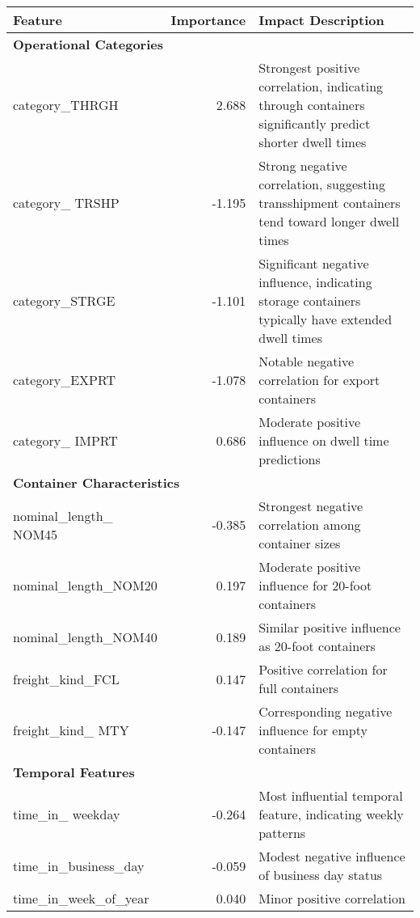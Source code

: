 		\begin{table}[htbp]
			\centering
			\begin{tabular}{|l|r|p{7cm}|}
				\hline
				\textbf{Feature} & \textbf{Importance} & \textbf{Impact Description}
				\\
				\hline
				\multicolumn{3}{|l|}{\textbf{Operational Categories}} \\
				\hline
				category\_THRGH & 2.688 & Strongest positive correlation, indicating
				through
				containers significantly predict shorter dwell times \\
				\hline
				category\_
				TRSHP & -1.195 & Strong negative correlation, suggesting transshipment
				containers tend toward longer dwell times \\
				\hline
				category\_STRGE & -1.101 & Significant negative influence, indicating
				storage
				containers typically have extended dwell times \\
				\hline
				category\_EXPRT & -1.078 & Notable negative correlation for export
				containers
				\\
				\hline
				category\_
				IMPRT & 0.686 & Moderate positive influence on dwell time predictions
				\\
				\hline
				\multicolumn{3}{|l|}{\textbf{Container Characteristics}} \\
				\hline
				nominal\_length\_
				NOM45 & -0.385 & Strongest negative correlation among container sizes
				\\
				\hline
				nominal\_length\_NOM20 & 0.197 & Moderate positive influence for 20-foot
				containers
				\\
				\hline
				nominal\_length\_NOM40 & 0.189 & Similar positive influence as 20-foot containers
				\\
				\hline
				freight\_kind\_FCL & 0.147 & Positive correlation for full containers
				\\
				\hline
				freight\_kind\_
				MTY & -0.147 & Corresponding negative influence for empty containers
				\\
				\hline
				\multicolumn{3}{|l|}{\textbf{Temporal Features}} \\
				\hline
				time\_in\_
				weekday & -0.264 & Most influential temporal feature, indicating weekly
				patterns \\
				\hline
				time\_in\_business\_day & -0.059 & Modest negative influence of business day status
				\\
				\hline
				time\_in\_week\_of\_year & 0.040 & Minor positive correlation
				\\

\end{tabular}
\end{table}
